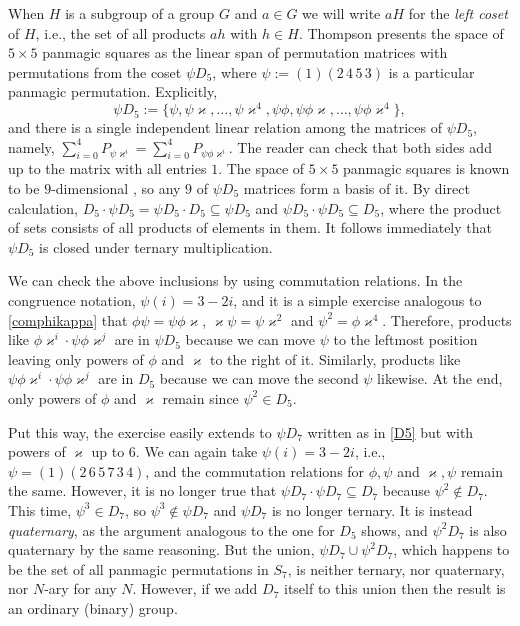 \documentclass[11pt]{article}
\theoremstyle{plain}
\theoremstyle{definition}
\newcommand{\+}[1]{{#1}^\times}
\def\k{{\varkappa}}
\begin{document}
When $H$ is a subgroup of a group $G$ and $a\in G$ we will write $aH$ for the {\it left coset} of $H$, i.e., the set of all products $ah$ with $h\in H$. Thompson presents the space of $5\times5$ panmagic squares as the linear span of permutation matrices with permutations from the coset $\psi D_5$, where 
$\psi:=(1)(2\,4\,5\,3)$ is a particular panmagic permutation. Explicitly,
\begin{equation}\label{D5}
\psi D_5:=\{\psi,\psi\k,\dots,\psi\k^4,\psi\phi,\psi\phi\k,\dots,\psi\phi\k^4\},
\end{equation}
and there is a single independent linear relation among the matrices of $\psi D_5$, namely, $\sum_{i=0}^4P_{\psi\k^i}=\sum_{i=0}^4P_{\psi\phi\k^i}$. The reader can check that both sides add up to the matrix with all entries $1$. The space of $5\times5$ panmagic squares is known to be $9$-dimensional \cite{Hou}, so any $9$ of $\psi D_5$ matrices form a basis of it. By direct calculation, $D_5\cdot\psi D_5=\psi D_5\cdot D_5\subseteq\psi D_5$ and $\psi D_5\cdot\psi D_5\subseteq D_5$, where the product of sets consists of all products of elements in them. It follows immediately that $\psi D_5$ is closed under ternary multiplication.

We can check the above inclusions by using commutation relations. In the congruence notation, $\psi(i)=3-2i$, and it is a simple exercise analogous to \eqref{comphikappa} that $\phi\psi=\psi\phi\k$, $\k\psi=\psi\k^2$ and $\psi^2=\phi\k^{4}$. Therefore, products like $\phi\k^i\cdot\psi\phi\k^j$ are in $\psi D_5$ because we can move $\psi$ to the leftmost position leaving only powers of $\phi$ and $\k$ to the right of it. Similarly, products like $\psi\phi\k^i\cdot\psi\phi\k^j$ are in $D_5$ because we can move the second $\psi$ likewise. At the end, only powers of $\phi$ and $\k$ remain since $\psi^2\in D_5$.

Put this way, the exercise easily extends to $\psi D_7$ written as in \eqref{D5} but with powers of $\k$ up to $6$. We can again take $\psi(i)=3-2i$, i.e., $\psi=(1)(2\,6\,5\,7\,3\,4)$, and the commutation relations for $\phi,\psi$ and $\k,\psi$ remain the same. However, it is no longer true that $\psi D_7\cdot\psi D_7\subseteq D_7$ because $\psi^2\not\in D_7$. This time, $\psi^3\in D_7$, so $\psi^3\not\in\psi D_7$ and $\psi D_7$ is no longer ternary. It is instead {\it quaternary}, as the argument analogous to the one for $D_5$ shows, and $\psi^2D_7$ is also quaternary by the same reasoning. But the union, $\psi D_7\cup\psi^2D_7$, which happens to be the set of all panmagic permutations in $S_7$, is neither ternary, nor quaternary, nor $N$-ary for any $N$. However, if we add $D_7$ itself to this union then the result is an ordinary (binary) group.
\end{document}
